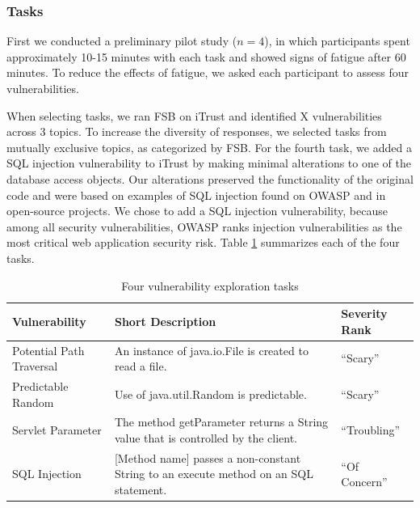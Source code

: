 \documentclass{acm_proc_article-sp}
\begin{document}
%



  
\subsubsection{Tasks}
First we conducted a preliminary pilot study ($n = 4$), in which  participants spent approximately 10-15 minutes with each task and showed signs of fatigue after 60 minutes.
To reduce the effects of fatigue, we asked each participant to assess four vulnerabilities. 

When selecting tasks, we ran FSB on iTrust and identified X vulnerabilities across 3 topics.
To increase the diversity of responses, we selected tasks from mutually exclusive topics, as categorized by FSB.
For the fourth task, we added a SQL injection vulnerability to iTrust by making minimal alterations to one of the database access objects.
Our alterations preserved the functionality of the original code and were based on examples of SQL injection found on OWASP and in open-source projects.
We chose to add a SQL injection vulnerability, because among all security vulnerabilities, OWASP ranks injection vulnerabilities as the most critical web application security risk.
Table \ref{table:vulnerabilities} summarizes each of the four tasks. 

\begin{table} 
\centering
\caption{Four vulnerability exploration tasks}
\begin{tabularx}{\textwidth}{|l|X|l|}
\rowcolor{gray!50}
\hline
    Vulnerability				& Short Description													& Severity Rank 	\\
    \hline	
    Potential Path Traversal	& An instance of java.io.File is created to read a file.     			& ``Scary''	    \\
    \hline
    Predictable Random			& Use of java.util.Random is predictable. 								& ``Scary''		\\
    \hline
    Servlet Parameter 			& The method getParameter returns a String value that is controlled by the client.			& ``Troubling''	\\
    \hline
    SQL Injection				& [Method name] passes a non-constant String to an execute method on an SQL statement.     	& ``Of Concern'' \\
    \hline
\end{tabularx}
\label{table:vulnerabilities}
\end{table}
\end{document}
